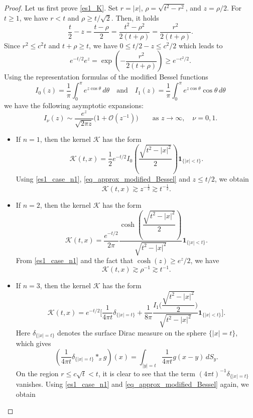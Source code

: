 \documentclass[11pt,reqno]{amsart}
\newcommand{\tron}[1]{\left(#1\right)}
\begin{document}
	\begin{proof}
		Let us first prove \eqref{es1_K}. Set $r=|x|$, $\rho=\sqrt{t^2-r^2}$, and $z=\rho/2$. For $t\geq 1$, we have $r<t$ and $\rho\geq t/\sqrt{2}$. Then, it holds 
		\[
		\frac{t}{2}-z=\frac{t-\rho}{2}=\frac{t^2-\rho^2}{2(t+\rho)}=\frac{r^2}{2(t+\rho)}.
		\]
		Since $r^2\leq c^2t$ and $t+\rho\geq t$, we have $0\leq t/2-z\leq c^2/2$ which leads to
		\begin{equation}\label{es1_case_n1}
			e^{-t/2}e^z=\exp\tron{-\frac{r^2}{2(t+\rho)}}\geq e^{-c^2/2}.
		\end{equation}
		Using the representation formulas of the modified Bessel functions
		\[
		I_0(z)=\frac{1}{\pi}\int_0^{\pi}e^{z\cos\theta}\,d\theta\quad\text{and}\quad I_1(z)=\frac{1}{\pi}\int_0^{\pi}e^{z\cos\theta}\cos\theta\,d\theta
		\]
		we have the following asymptotic expansions:
		\begin{equation}\label{eq_approx_modified_Bessel}
			I_{\nu}(z)\sim \frac{e^z}{\sqrt{2\pi z}}\bigl(1+\mathcal{O}(z^{-1})\bigr)\qquad\text{as }z\to\infty,\quad \nu=0,1.
		\end{equation}
		\begin{itemize}[leftmargin=*]
			\item If $n=1$, then the kernel $\mathcal{K}$ has the form
			\[
			\mathcal{K}(t,x)=\frac{1}{2}e^{-t/2}
			I_0\left(\frac{\sqrt{t^2-|x|^2}}{2}\right)
			\mathbf{1}_{\{|x|<t\}}.
			\]
			Using \eqref{es1_case_n1}, \eqref{eq_approx_modified_Bessel} and $z\leq t/2$, we obtain
			\[
			\mathcal{K}(t,x)\gtrsim z^{-\frac{1}{2}}\gtrsim t^{-\frac{1}{2}}.
			\]
			\item If $n=2$, then the kernel $\mathcal{K}$ has the form
			\[
			\mathcal{K}(t,x)=\frac{e^{-t/2}}{2\pi}\frac{\cosh\left(\dfrac{\sqrt{t^2-|x|^2}}{2}\right)}{\sqrt{t^2-|x|^2}}\mathbf{1}_{\{|x|<t\}}.
			\]
			From \eqref{es1_case_n1} and the fact that $\cosh(z)\geq e^z/2$, we have
			\[
			\mathcal{K}(t,x)\gtrsim \rho^{-1}\gtrsim t^{-1}.
			\]
			\item If $n=3$, then the kernel $\mathcal{K}$ has the form
			\[
			\mathcal{K}(t,x)=e^{-t/2}\Bigg[\frac{1}{4\pi t}\delta_{\{|x|=t\}}+\frac{1}{8\pi}\frac{I_1\Big(\dfrac{\sqrt{t^2-|x|^2}}{2}\Big)}{\sqrt{t^2-|x|^2}}\mathbf{1}_{\{|x|<t\}}
			\Bigg].
			\]
			Here $\delta_{\{|x|=t\}}$ denotes the surface Dirac measure on the sphere
			$\{|x|=t\}$, which gives
			\[
			\left(\frac{1}{4\pi t}\delta_{\{|x|=t\}}\ast_x g\right)(x)=\int_{|y|=t}\frac{1}{4\pi t}g(x-y)\,dS_y.
			\]
			On the region $r\leq c\sqrt{t}<t$, it is clear to see that the term $(4\pi t)^{-1}\delta_{\{|x|=t\}}$ vanishes. Using \eqref{es1_case_n1} and \eqref{eq_approx_modified_Bessel} again, we obtain

\end{itemize}
\end{proof}
\end{document}
